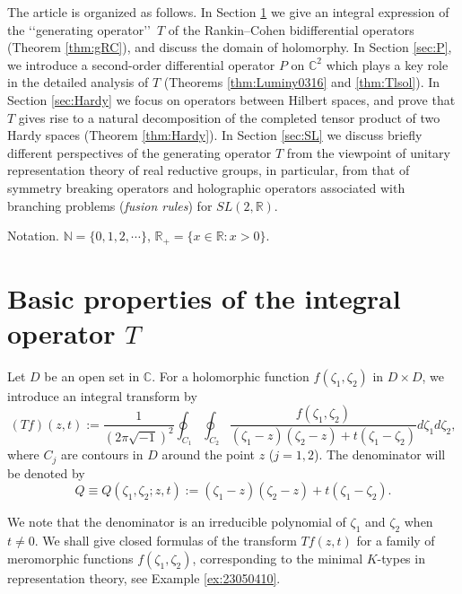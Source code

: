 \documentclass[12pt,leqno]{amsart}
\theoremstyle{plain}
\theoremstyle{definition}
\begin{document}
\vskip 1pc



The article is organized as follows.  
In Section \ref{sec:T} we give an integral expression of 
 the \lq\lq{generating operator}\rq\rq\ $T$
 of the Rankin--Cohen bidifferential operators
 (Theorem \ref{thm:gRC}), 
 and discuss the domain of holomorphy.  
In Section \ref{sec:P}, 
 we introduce a second-order differential operator $P$
 on ${\mathbb{C}}^2$
 which plays a key role 
 in the detailed analysis of $T$
 (Theorems \ref{thm:Luminy0316} and \ref{thm:Tlsol}).  
In Section \ref{sec:Hardy}
 we focus on operators between Hilbert spaces, 
 and prove
 that $T$ gives rise to a natural decomposition 
 of the completed tensor product of two Hardy spaces
 (Theorem \ref{thm:Hardy}).  
In Section \ref{sec:SL}
 we discuss briefly different perspectives
 of the generating operator $T$ from the viewpoint of unitary representation theory
 of real reductive groups, 
 in particular, from that of symmetry breaking operators
 and holographic operators
 associated with branching problems 
 ({\it{fusion rules}})
 for $SL(2,{\mathbb{R}})$.  
\vskip 1pc


Notation.\enspace
${\mathbb{N}}=\{0,1,2,\cdots\}$, 
${\mathbb{R}}_+=\{x \in {\mathbb{R}}: x>0\}$.  

\section{Basic properties of the integral operator $T$}
\label{sec:T}


Let $D$ be an open set in ${\mathbb{C}}$.  
For a holomorphic function $f(\zeta_1, \zeta_2)$ in $D \times D$, 
 we introduce an integral transform by 
\begin{equation}
\label{eqn:Luminy230314}
(T f)(z,t):=
\frac{1}{(2 \pi \sqrt{-1})^2}\oint_{C_1}\oint_{C_2} 
\frac{f(\zeta_1, \zeta_2)}{(\zeta_1-z)(\zeta_2-z)+t(\zeta_1 - \zeta_2)}d \zeta_1 d \zeta_2, 
\end{equation}
where $C_j$ are contours in $D$
 around the point $z$ ($j=1,2$).  
The denominator will be denoted by 
\begin{equation}
\label{eqn:Q}
Q \equiv Q(\zeta_1, \zeta_2;z, t):=(\zeta_1-z)(\zeta_2-z)+t(\zeta_1-\zeta_2).  
\end{equation}



We note that the denominator is an irreducible polynomial of $\zeta_1$ and $\zeta_2$ when $t \ne 0$. 
We shall give closed formulas of the transform $T f(z,t)$
 for a family of meromorphic functions $f(\zeta_1, \zeta_2)$, corresponding to the minimal
 $K$-types in representation theory, see Example \ref{ex:23050410}.  
\end{document}

